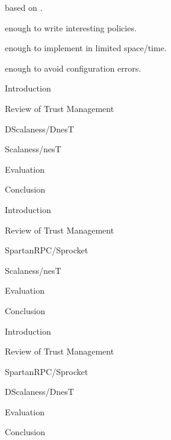 
\begin{citemize}
\item {} based on \datalog.
\item {} enough to write interesting policies.
\item {} enough to implement in limited space/time.
\item {} enough to avoid configuration errors.
\end{citemize}
\stopslide


\begin{cenumerate}
\item Introduction
\item Review of Trust Management
\item {}
\item DScalaness/DnesT
\item Scalaness/nesT
\item Evaluation
\item Conclusion
\end{cenumerate}
\stopslide


\begin{cenumerate}
\item Introduction
\item Review of Trust Management
\item SpartanRPC/Sprocket
\item {}
\item Scalaness/nesT
\item Evaluation
\item Conclusion
\end{cenumerate}
\stopslide


\begin{cenumerate}
\item Introduction
\item Review of Trust Management
\item SpartanRPC/Sprocket
\item DScalaness/DnesT
\item {}
\item Evaluation
\item Conclusion
\end{cenumerate}
\stopslide

